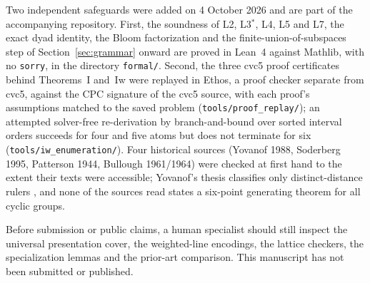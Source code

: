 \documentclass[11pt]{article}
\theoremstyle{remark}
\newcommand{\code}[1]{\nolinkurl{#1}}
\begin{document}
Two independent safeguards were added on 4 October 2026 and are part of the
accompanying repository. First, the soundness of L2, L3$^*$, L4, L5 and L7,
the exact dyad identity, the Bloom factorization and the
finite-union-of-subspaces step of Section~\ref{sec:grammar} onward are proved in
Lean~4 against Mathlib, with no \texttt{sorry}, in the directory
\code{formal/}. Second, the three cvc5 proof certificates behind Theorems~I and~Iw were
replayed in Ethos, a proof checker separate from cvc5, against the CPC
signature of the cvc5 source, with each proof's assumptions matched to the
saved problem (\code{tools/proof\_replay/}); an attempted solver-free
re-derivation by branch-and-bound over sorted interval orders succeeds for
four and five atoms but does not terminate for six
(\code{tools/iw\_enumeration/}). Four historical sources (Yovanof 1988, Soderberg 1995, Patterson 1944,
Bullough 1961/1964) were checked at first hand to the extent their texts
were accessible; Yovanof's thesis classifies only distinct-distance rulers
\cite{yovanof}, and none of the sources read states a six-point generating
theorem for all cyclic groups.

Before submission or public claims, a human specialist should still inspect
the universal presentation cover, the weighted-line encodings, the lattice
checkers, the specialization lemmas and the prior-art comparison. This
manuscript has not been submitted or published.
\end{document}
